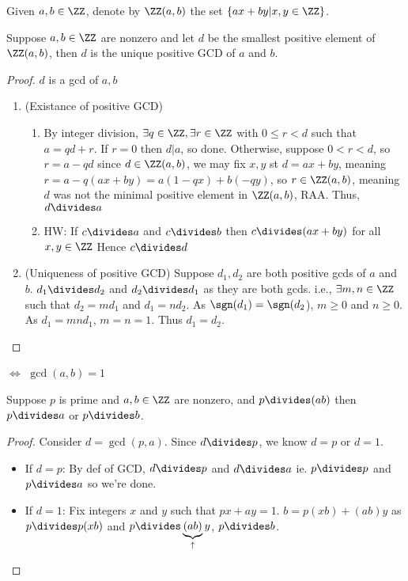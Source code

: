 \documentclass[notes.tex]{subfiles}
\begin{document}

\begin{definition}
	Given $a, b\in\ZZ$, denote by $\ZZ(a, b)$ the set $\{ax+by | x,y\in\ZZ\}$.
\end{definition}

\begin{theorem}
	 Suppose $a, b\in\ZZ$ are nonzero and let $d$ be the smallest positive element of $\ZZ(a, b)$, then $d$ is the unique positive GCD of $a$ and $b$.
\end{theorem} 
\begin{proof}
	$d$ is a gcd of $a, b$
	\begin{enumerate}
		\item (Existance of positive GCD)
		\begin{enumerate}
			\item By integer division, $\exists q \in \ZZ, \exists r\in \ZZ$ with $0\le r < d$ such that $a = qd+r$. If $r=0$ then $d|a$, so done.
			Otherwise, suppose $0 < r < d$, so $r = a-qd$
			since $d\in\ZZ(a, b)$, we may fix $x, y$ st $d=ax+by$, meaning $r=a-q(ax+by) = a(1-qx) + b(-qy)$, so $r\in \ZZ(a, b)$, meaning $d$ was not the minimal positive element in $\ZZ(a, b)$, RAA.
			Thus, $d\divides a$
			\item
			HW: If $c\divides a$ and $c\divides b$ then $c\divides(ax+by)$ for all $x, y\in\ZZ$ Hence $c\divides d$
		\end{enumerate}
		\item (Uniqueness of positive GCD)
			Suppose $d_1, d_2$ are both positive gcds of $a$ and $b$.
			$d_1\divides d_2$ and $d_2 \divides d_1$ as they are both gcds. i.e., $\exists m, n \in\ZZ$ such that $d_2=md_1$ and $d_1=nd_2$. As $\sgn(d_1) = \sgn(d_2$), $m \ge 0$ and $n \ge 0$. As $d_1 = mn d_1$, $m = n = 1$. Thus $d_1 = d_2$. 
	\end{enumerate}
\end{proof}

\begin{definition}
	 $\iff$ $\gcd(a, b) = 1$
\end{definition}

\begin{theorem}
	Suppose $p$ is prime and $a, b\in\ZZ$ are nonzero, and $p\divides (ab)$ then $p\divides a$ or $p\divides b$.
\end{theorem}

\begin{proof}
	Consider $d = \gcd(p, a)$. Since $d\divides p$, we know $d=p$ or $d = 1$.
	\begin{itemize}
		\item[] If $d=p$: By def of GCD, $d\divides p$ and $d\divides a$ ie. $p\divides p$ and $p \divides a$ so we're done.
		\item[] If $d=1$: Fix integers $x$ and $y$ such that $px+ay=1$. $b=p(xb)+(ab)y$
		as $p\divides p(xb)$ and $p\divides \underbrace{(ab)}_{\uparrow}y$, $p\divides b$.
	\end{itemize}
\end{proof}
\end{document}

